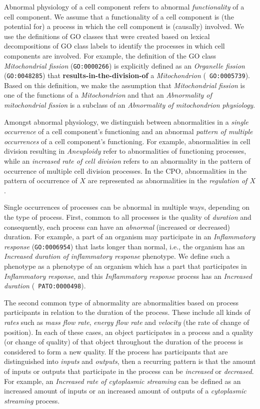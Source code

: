 \documentclass{bioinfo}
\renewcommand{\cite}{\citep}
\begin{document}
Abnormal physiology of a cell component refers to abnormal {\em
  functionality} of a cell component. We assume that a functionality
of a cell component is (the potential for) a process in which the cell
component is (causally) involved. We use the definitions of GO classes
that were created based on lexical decompositions of GO class labels
\cite{Mungall2010go, Bada2007a, Ogren2004} to identify the processes
in which cell components are involved. For example, the definition of
the GO class {\em Mitochondrial fission} ({\tt GO:0000266}) is
explicitly defined as an {\em Organelle fission} ({\tt GO:0048285})
that {\bf results-in-the-division-of} a {\em Mitochondrion} ({\tt
  GO:0005739}). Based on this definition, we make the assumption that
{\em Mitochondrial fission} is one of the functions of a {\em
  Mitochondrion} and that an {\em Abnormality of mitochondrial
  fission} is a subclass of an {\em Abnormality of mitochondrion
  physiology}.

Amongst abnormal physiology, we distinguish between abnormalities in a
{\em single occurrence} of a cell component's functioning and an
abnormal {\em pattern of multiple occurrences} of a cell component's
functioning. For example, abnormalities in cell division resulting in
{\em Aneuploidy} refer to abnormalities of functioning processes,
while an {\em increased rate of cell division} refers to an
abnormality in the pattern of occurrence of multiple cell division
processes. In the CPO, abnormalities in the pattern of occurrence of
$X$ are represented as abnormalities in the {\em regulation of $X$}.

Single occurrences of processes can be abnormal in multiple ways,
depending on the type of process.
%
First, common to all processes is the quality of {\em duration} and
consequently, each process can have an {\em abnormal} (increased or
decreased) duration. For example, a part of an organism may
participate in an {\em Inflammatory response} ({\tt GO:0006954}) that
lasts longer than normal, i.e., the organism has an {\em Increased
  duration of inflammatory response} phenotype. We define such a
phenotype as a phenotype of an organism which has a part that
participates in {\em Inflammatory response}, and this {\em
  Inflammatory response} process has an {\em Increased duration} ({\tt
  PATO:0000498}).

The second common type of abnormality are abnormalities based on
process participants in relation to the duration of the process. These
include all kinds of {\em rates} such as {\em mass flow rate}, {\em
  energy flow rate} and {\em velocity} (the rate of change of
position). In each of these cases, an object participates in a process
and a quality (or change of quality) of that object throughout the
duration of the process is considered to form a new quality. If the
process has participants that are distinguished into {\em inputs} and
{\em outputs}, then a recurring pattern is that the amount of inputs
or outputs that participate in the process can be {\em increased} or
{\em decreased}. For example, an {\em Increased rate of cytoplasmic
  streaming} can be defined as an increased amount of inputs or an
increased amount of outputs of a {\em cytoplasmic streaming} process.
\end{document}
